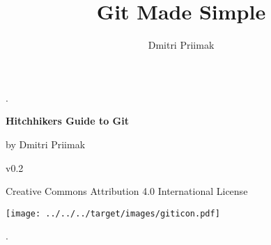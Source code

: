 \documentclass{article}
\title{Git Made Simple}
\author{Dmitri Priimak}
\date{}
\theoremstyle{definition}
\begin{document}
       \newcommand{\segment}[1]{$\overline{#1}$}
       \newcommand{\msegment}[1]{\overline{#1}}
       \thispagestyle{empty}
       \begin{center}
           .

       \vspace{4cm}
       {\Huge \textbf{Hitchhikers Guide to Git}}

               \vspace{6mm}
       {\large by Dmitri Priimak

       v0.2
       }


       Creative Commons Attribution 4.0 International License


               \vspace{2cm}

       \texttt{[image: ../../../target/images/giticon.pdf]}
       \end{center}
       \newpage
       .
       \newpage
       \tableofcontents
       \newpage
       \setcounter{page}{1}
\end{document}
